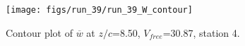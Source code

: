 \begin{figure}[H]
\centering
\texttt{[image: figs/run\_39/run\_39\_W\_contour]}
\caption{Contour plot of $\overline{w}$ at $z/c$=8.50, $V_{free}$=30.87, station 4.}
\label{fig:run_39_W_contour}
\end{figure}


